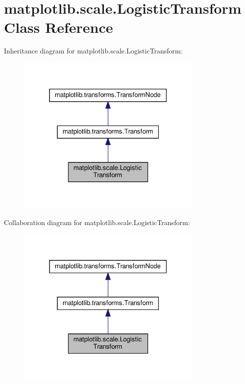 \hypertarget{classmatplotlib_1_1scale_1_1LogisticTransform}{}\section{matplotlib.\+scale.\+Logistic\+Transform Class Reference}
\label{classmatplotlib_1_1scale_1_1LogisticTransform}


Inheritance diagram for matplotlib.\+scale.\+Logistic\+Transform\+:
\nopagebreak
\begin{figure}[H]
\begin{center}
\leavevmode
\includegraphics[width=259pt]{classmatplotlib_1_1scale_1_1LogisticTransform__inherit__graph}
\end{center}
\end{figure}


Collaboration diagram for matplotlib.\+scale.\+Logistic\+Transform\+:
\nopagebreak
\begin{figure}[H]
\begin{center}
\leavevmode
\includegraphics[width=259pt]{classmatplotlib_1_1scale_1_1LogisticTransform__coll__graph}
\end{center}
\end{figure}
